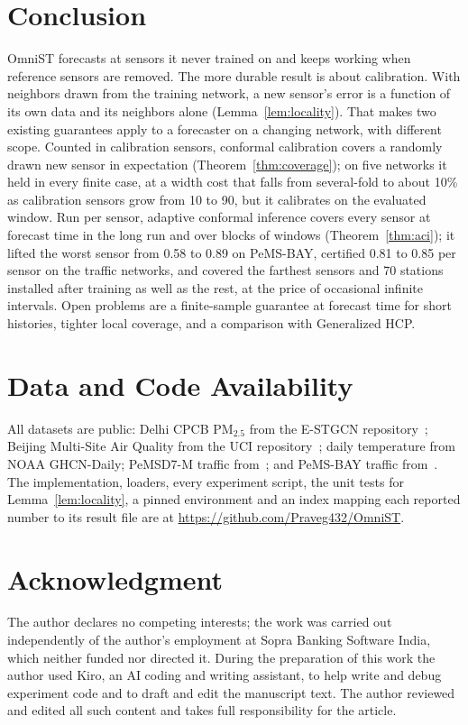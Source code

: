 \documentclass[journal,twoside,web]{ieeecolor}
\newcommand{\repourl}{https://github.com/Praveg432/OmniST}
\begin{document}
\section{Conclusion}
\label{sec:conclusion}
OmniST forecasts at sensors it never trained on and keeps working when reference sensors are removed. The more
durable result is about calibration. With neighbors drawn from the training network, a new sensor's error is a
function of its own data and its neighbors alone (Lemma~\ref{lem:locality}). That makes two existing guarantees
apply to a forecaster on a changing network, with different scope. Counted in calibration sensors, conformal
calibration covers a randomly drawn new sensor in expectation (Theorem~\ref{thm:coverage}); on five networks it
held in every finite case, at a width cost that falls from several-fold to about 10\% as calibration sensors
grow from 10 to 90, but it calibrates on the evaluated window. Run per sensor, adaptive conformal inference covers
every sensor at forecast time in the long run and over blocks of windows (Theorem~\ref{thm:aci}); it lifted the
worst sensor from 0.58 to 0.89 on PeMS-BAY, certified 0.81 to 0.85 per sensor on the traffic networks, and covered the
farthest sensors and 70 stations installed after training as well as the rest, at the price of occasional infinite
intervals.   Open problems are a finite-sample guarantee at forecast time for short histories, tighter local coverage, and a comparison with Generalized HCP.
\section*{Data and Code Availability}
All datasets are public: Delhi CPCB PM$_{2.5}$ from the E-STGCN repository~\cite{panja2026estgcn};
Beijing Multi-Site Air Quality from the UCI repository~\cite{zhang2017beijingair}; daily temperature from NOAA
GHCN-Daily; PeMSD7-M traffic from~\cite{yu2018stgcn}; and PeMS-BAY traffic from~\cite{li2018dcrnn}. The
implementation, loaders, every experiment script, the unit tests for Lemma~\ref{lem:locality}, a pinned environment and
an index mapping each reported number to its result file are at \url{\repourl}.
\section*{Acknowledgment}
The author declares no competing interests; the work was carried out
independently of the author's employment at Sopra Banking Software India, which neither funded nor
directed it. During the preparation of this work the author used Kiro, an AI coding and writing
assistant, to help write and debug experiment code and to draft and edit the manuscript text. The
author reviewed and edited all such content and takes full responsibility for the article.
\end{document}
